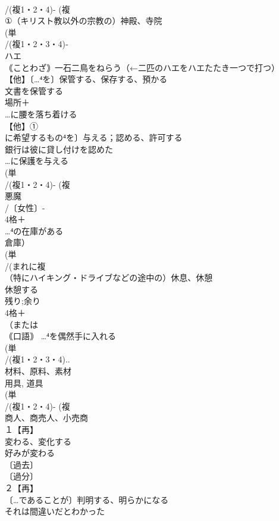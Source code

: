 \documentclass[8pt]{extreport}
\begin{document}
\begin{CJK}{UTF8}{min}
\\	/(複1・2・4)- (複
\\	①（キリスト教以外の宗教の）神殿、寺院 
\\	(単
\\	/(複1・2・3・4)‐
\\	ハエ 
\\	｟ことわざ｠一石二鳥をねらう（←二匹のハエをハエたたき一つで打つ）
\\	【他】〔…⁴を〕保管する、保存する、預かる 
\\	文書を保管する
\\	場所＋
\\	…に腰を落ち着ける
\\	【他】①
\\	に希望するもの⁴を〕与える；認める、許可する 
\\	銀行は彼に貸し付けを認めた 
\\	…に保護を与える 
\\	(単
\\	/(複1・2・4)- (複
\\	悪魔 
\\	/〔女性〕-
\\	4格＋
\\	…⁴の在庫がある 
\\	倉庫）
\\	(単
\\	/(まれに複
\\	（特にハイキング・ドライブなどの途中の）休息、休憩 
\\	休憩する 
\\	残り;余り
\\	4格＋
\\	（または
\\	｟口語｠ …⁴を偶然手に入れる
\\	(単
\\	/(複1・2・3・4)..
\\	材料、原料、素材　
\\	用具, 道具
\\	(単
\\	/(複1・2・4)- (複
\\	商人、商売人、小売商 
\\	１【再】
\\	変わる、変化する 
\\	好みが変わる
\\	〔過去〕
\\	〔過分〕
\\	２【再】
\\	〔…であることが〕判明する、明らかになる 
\\	それは間違いだとわかった 

\end{CJK}
\end{document}
